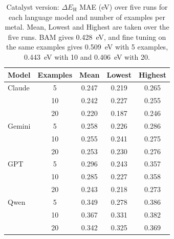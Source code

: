 \begin{table}[h]
\caption{Catalyst version: $\Delta E_\mathrm{H}$ MAE (eV) over five runs for each language model and number of examples per metal. Mean, Lowest and Highest are taken over the five runs. BAM gives 0.428~eV, and fine tuning on the same examples gives 0.509~eV with 5 examples, 0.443~eV with 10 and 0.406~eV with 20.}
\label{tab:si-cat-runs}
\small
\setlength{\tabcolsep}{12pt}
\begin{tabular}{lcccc}
\toprule
Model & Examples & Mean & Lowest & Highest \\
\midrule
Claude & 5 & 0.247 & 0.219 & 0.265 \\
 & 10 & 0.242 & 0.227 & 0.255 \\
 & 20 & 0.220 & 0.187 & 0.246 \\
\midrule
Gemini & 5 & 0.258 & 0.226 & 0.286 \\
 & 10 & 0.255 & 0.241 & 0.275 \\
 & 20 & 0.253 & 0.230 & 0.276 \\
\midrule
GPT & 5 & 0.296 & 0.243 & 0.357 \\
 & 10 & 0.285 & 0.227 & 0.358 \\
 & 20 & 0.243 & 0.218 & 0.273 \\
\midrule
Qwen & 5 & 0.349 & 0.278 & 0.386 \\
 & 10 & 0.367 & 0.331 & 0.382 \\
 & 20 & 0.342 & 0.325 & 0.369 \\
\bottomrule
\end{tabular}
\end{table}

\FloatBarrier

